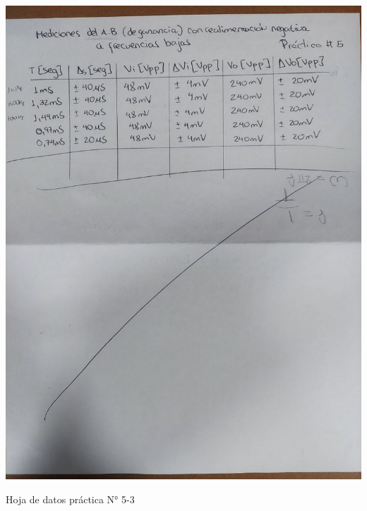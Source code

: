 \begin{ilustracion}[ht]
    \centering
    \includegraphics[width=1.0\textwidth, angle=90]{src/images/p5/p5-hoja-de-datos-3.jpg}
    \caption{Hoja de datos práctica N° 5-3}
    \label{ilus:hoja-de-datos-p5-3}
\end{ilustracion}




